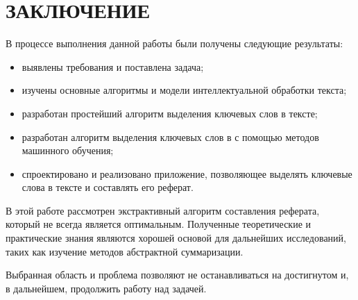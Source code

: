 \chapter*{ЗАКЛЮЧЕНИЕ}

В процессе выполнения данной работы были получены следующие результаты:

\begin{itemize}
    \item выявлены требования и поставлена задача;
    \item изучены основные алгоритмы и модели интеллектуальной обработки текста;
    \item разработан простейший алгоритм выделения ключевых слов в тексте;
    \item разработан алгоритм выделения ключевых слов в с помощью методов машинного обучения;
    \item спроектировано и реализовано приложение, позволяющее выделять ключевые слова в тексте и составлять его реферат.
\end{itemize}

В этой работе рассмотрен экстрактивный алгоритм составления реферата, который не всегда является оптимальным. Полученные теоретические и практические знания являются хорошей основой для дальнейших исследований, таких как изучение методов абстрактной суммаризации.

Выбранная область и проблема позволяют не останавливаться на достигнутом и, в дальнейшем, продолжить работу над задачей.
\newpage
